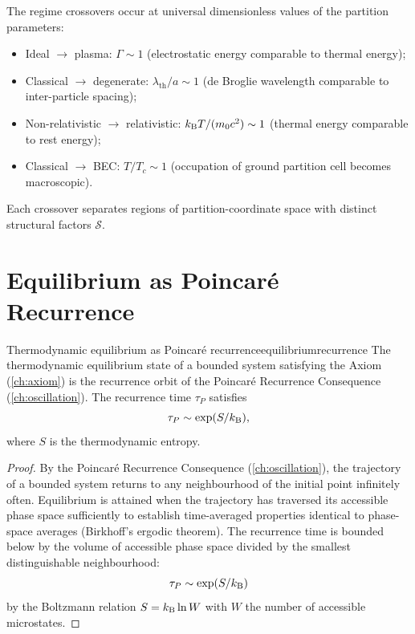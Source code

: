 \begin{remark}
The regime crossovers occur at universal dimensionless values of the
partition parameters:
\begin{itemize}[nosep]
  \item Ideal $\to$ plasma: $\Gamma \sim 1$
    (electrostatic energy comparable to thermal energy);
  \item Classical $\to$ degenerate: $\lambda_{\mathrm{th}}/a \sim 1$
    (de Broglie wavelength comparable to inter-particle spacing);
  \item Non-relativistic $\to$ relativistic: $k_{\mathrm{B}} T/(m_0c^2) \sim 1$
    (thermal energy comparable to rest energy);
  \item Classical $\to$ BEC: $T/T_c \sim 1$
    (occupation of ground partition cell becomes macroscopic).
\end{itemize}
Each crossover separates regions of partition-coordinate space with
distinct structural factors $\mathcal{S}$.
\end{remark}

\section{Equilibrium as Poincar\'e Recurrence}
\label{sec:equilibriumrecurrence}

\begin{consequence}{Thermodynamic equilibrium as Poincar\'e recurrence}{equilibriumrecurrence}
The thermodynamic equilibrium state of a bounded system satisfying the
Axiom (\cref{ch:axiom}) is the recurrence orbit of the Poincar\'e
Recurrence Consequence (\cref{ch:oscillation}).  The recurrence time
$\tau_P$ satisfies
\begin{equation}
  \tau_P \sim \exp(S/k_{\mathrm{B}}),
  \label{eq:recurrencetime}
\end{equation}
where $S$ is the thermodynamic entropy.
\end{consequence}

\begin{proof}
By the Poincar\'e Recurrence Consequence (\cref{ch:oscillation}), the
trajectory of a bounded system returns to any neighbourhood of the initial
point infinitely often.  Equilibrium is attained when the trajectory has
traversed its accessible phase space sufficiently to establish
time-averaged properties identical to phase-space averages (Birkhoff's
ergodic theorem).  The recurrence time is bounded below by the volume of
accessible phase space divided by the smallest distinguishable
neighbourhood:
\[
  \tau_P \sim \exp(S/k_{\mathrm{B}})
\]
by the Boltzmann relation $S = k_{\mathrm{B}} \ln W$ with $W$ the number of
accessible microstates.
\end{proof}


